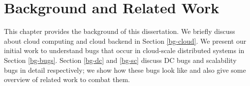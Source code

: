 \chapter{Background and Related Work}
\label{chp-bg}

This chapter provides the background of this dissertation. We briefly discuss
about cloud computing and cloud backend in Section \ref{bg-cloud}. We present
our initial work to understand bugs that occur in cloud-scale distributed
systems in Section \ref{bg-bugs}. Section \ref{bg-dc} and \ref{bg-sc} discuss DC
bugs and scalability bugs in detail respectively; we show how these bugs look
like and also give some overview of related work to combat them.
%



%


